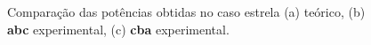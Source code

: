 \documentclass[a4paper,12pt,oneside,openany,table,xcdraw]{article}
\begin{document}
\begin{figure}[H]
\centering
\captionsetup{font=scriptsize}


\caption{Comparação das potências obtidas no caso estrela (a) teórico, (b) \textbf{abc} experimental, (c) \textbf{cba} experimental.}
\label{pot-tab1}
\end{figure}
\end{document}
